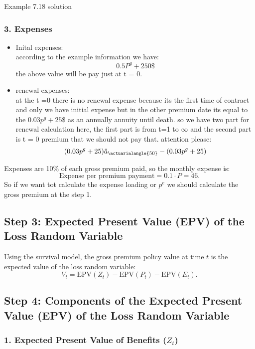 \begin{solve}{}{Example 7.18 solution}
		\subsubsection*{3. Expenses}
			\begin{itemize}
			\item Inital expenses:\\
			according to the example information we have:
			$$0.5P^g + 250\$$$ 
			the above value will be pay just at t = 0.
		
			\item renewal expenses:\\
			 at the t =0 there is no renewal expense because its the first time of contract and only we have initial expense but in the other premium date its equal to the $0.03 p^g + 25\$$ as an annually annuity until death. so we have two part for renewal calculation here, the first part is from t=1 to $\infty$ and the second part is t = 0 premium that we should not pay that. attention please:
			 $$(0.03 p^g + 25) \ddot{a}_{\actuarialangle{50}} - (0.03 p^g + 25)$$
			\end{itemize}

		Expenses are 10\% of each gross premium paid, so the monthly expense is:
		\[
		\text{Expense per premium payment} = 0.1 \cdot P = 46.
		\]
		So if we want tot calculate the expense loading or $p^e$ we should calculate the gross premium at the step 1.
		
		
		\subsection*{Step 3: Expected Present Value (EPV) of the Loss Random Variable}
		Using the survival model, the gross premium policy value at time $t$ is the expected value of the loss random variable:
		\[
		V_t = \text{EPV}(Z_t) - \text{EPV}(P_t) - \text{EPV}(E_t).
		\]
		\subsection*{Step 4: Components of the Expected Present Value (EPV) of the Loss Random Variable}
		\subsubsection*{1. Expected Present Value of Benefits (\(Z_t\))}
		

\end{solve}
